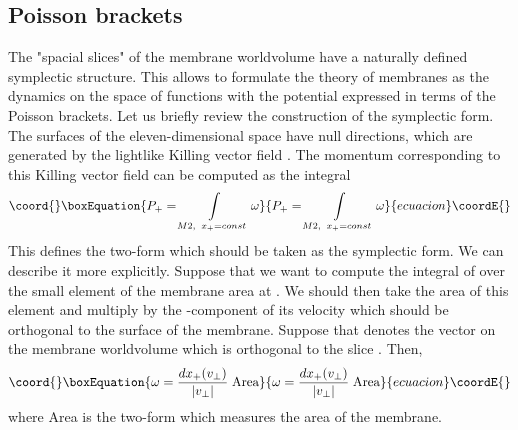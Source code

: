 \documentclass[a4paper,12pt]{article}
\begin{document}
\subsection{Poisson brackets}
The "spacial slices" \coordHE{} of the membrane worldvolume have a
naturally defined symplectic structure\cite{BST,dWHN}.
This allows to formulate the theory of membranes as the
dynamics on the space of functions \coordHE{} with the
potential expressed in terms of the Poisson brackets.
Let us briefly review the construction of the symplectic form.
The surfaces \coordHE{} of the eleven-dimensional
space have null directions, which are generated by the lightlike
Killing vector field \coordHE{}.
The momentum corresponding to this Killing vector field can be
computed as the integral
\begin{equation}\coord{}\boxEquation{
P_+=\int\limits_{M2,\;\; x_+=const}\omega
}{
P_+=\int\limits_{M2,\;\; x_+=const}\omega
}{ecuacion}\coordE{}\end{equation}
This defines the two-form \myHighlight{$\omega$}\coordHE{} which should be taken as the symplectic
form. We can describe it more explicitly. Suppose that we want to compute the integral
of \myHighlight{$\omega$}\coordHE{} over the small element of the membrane area at \coordHE{}.
We should then take the area of this element and
multiply by the \coordHE{}-component of its velocity which should be
orthogonal to the surface of the membrane. Suppose that \coordHE{} denotes the vector
on the  membrane worldvolume which is orthogonal to the slice \coordHE{}. Then,
\begin{equation}\coord{}\boxEquation{
\omega={dx_+(v_{\perp})\over |v_{\perp}|}\; \mbox{Area}
}{
\omega={dx_+(v_{\perp})\over |v_{\perp}|}\; \mbox{Area}
}{ecuacion}\coordE{}\end{equation}
where Area is the two-form which measures the area of the membrane.
\end{document}
